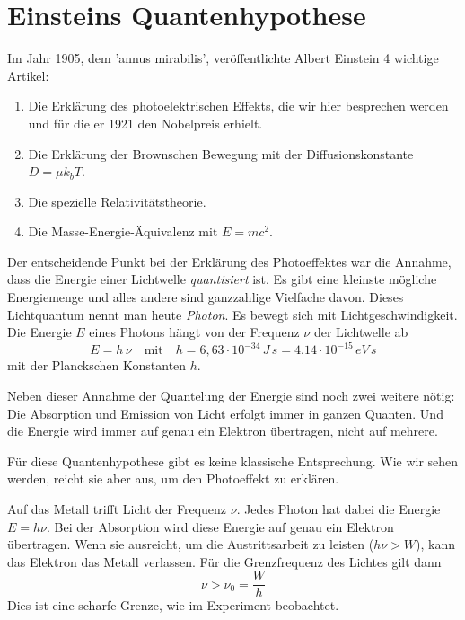 \section{Einsteins Quantenhypothese}

Im Jahr 1905, dem 'annus mirabilis',  veröffentlichte Albert Einstein 4 wichtige Artikel:
\begin{enumerate}
    \item Die Erklärung des photoelektrischen Effekts, die wir hier besprechen werden und für die er 1921 den Nobelpreis erhielt.
    \item Die Erklärung der Brownschen Bewegung mit der Diffusionskonstante $D = \mu k_b T$.
    \item Die spezielle Relativitätstheorie.
    \item Die Masse-Energie-Äquivalenz mit $E = m c^2$.
\end{enumerate}

Der entscheidende Punkt bei der Erklärung des Photoeffektes war die Annahme, dass die Energie einer Lichtwelle \emph{quantisiert} ist. Es gibt eine kleinste mögliche Energiemenge und alles andere sind ganzzahlige Vielfache davon. Dieses Lichtquantum nennt man heute \emph{Photon}. Es bewegt sich mit Lichtgeschwindigkeit.  Die Energie $E$ eines Photons hängt von der Frequenz $\nu$ der Lichtwelle ab
\begin{equation}
    E = h \, \nu \quad \text{mit} \quad h = 6,63 \cdot 10^{-34} \, J \, s = 4.14 \cdot 10^{-15}\, eV \, s
\end{equation}
mit der Planckschen Konstanten $h$. 

Neben dieser Annahme der Quantelung der Energie sind noch zwei weitere nötig: Die Absorption und Emission von Licht erfolgt immer in ganzen Quanten. Und die Energie wird immer auf genau ein Elektron übertragen, nicht auf mehrere.

Für diese Quantenhypothese gibt es keine klassische Entsprechung. Wie wir sehen werden, reicht sie aber aus, um den Photoeffekt zu erklären.

Auf das Metall trifft Licht der Frequenz $\nu$. Jedes Photon hat dabei die Energie $E = h \nu$. Bei der Absorption wird diese Energie auf genau ein Elektron übertragen. Wenn sie ausreicht, um die Austrittsarbeit zu leisten ($h \nu > W$), kann das Elektron das Metall verlassen. Für die Grenzfrequenz des Lichtes gilt dann
 \begin{equation}
     \nu > \nu_0 = \frac{W}{h}
 \end{equation}
 Dies ist eine scharfe Grenze, wie im Experiment beobachtet.

